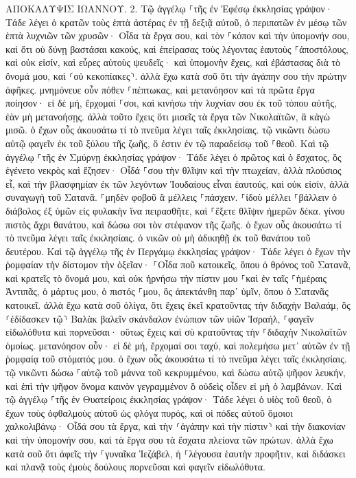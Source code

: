 \documentclass[twoside, 9pt]{extreport}
\begin{document}
ΑΠΟΚΑΛΥΨΙΣ ΙΩΑΝΝΟΥ.
2.
Τῷ ἀγγέλῳ ⸀τῆς ἐν Ἐφέσῳ ἐκκλησίας γράψον· Τάδε λέγει ὁ κρατῶν τοὺς ἑπτὰ ἀστέρας ἐν τῇ δεξιᾷ αὐτοῦ, ὁ περιπατῶν ἐν μέσῳ τῶν ἑπτὰ λυχνιῶν τῶν χρυσῶν· 
Οἶδα τὰ ἔργα σου, καὶ τὸν ⸀κόπον καὶ τὴν ὑπομονήν σου, καὶ ὅτι οὐ δύνῃ βαστάσαι κακούς, καὶ ἐπείρασας τοὺς λέγοντας ἑαυτοὺς ⸀ἀποστόλους, καὶ οὐκ εἰσίν, καὶ εὗρες αὐτοὺς ψευδεῖς· 
καὶ ὑπομονὴν ἔχεις, καὶ ἐβάστασας διὰ τὸ ὄνομά μου, καὶ ⸂οὐ κεκοπίακες⸃. 
ἀλλὰ ἔχω κατὰ σοῦ ὅτι τὴν ἀγάπην σου τὴν πρώτην ἀφῆκες. 
μνημόνευε οὖν πόθεν ⸀πέπτωκας, καὶ μετανόησον καὶ τὰ πρῶτα ἔργα ποίησον· εἰ δὲ μή, ἔρχομαί ⸀σοι, καὶ κινήσω τὴν λυχνίαν σου ἐκ τοῦ τόπου αὐτῆς, ἐὰν μὴ μετανοήσῃς. 
ἀλλὰ τοῦτο ἔχεις ὅτι μισεῖς τὰ ἔργα τῶν Νικολαϊτῶν, ἃ κἀγὼ μισῶ. 
ὁ ἔχων οὖς ἀκουσάτω τί τὸ πνεῦμα λέγει ταῖς ἐκκλησίαις. τῷ νικῶντι δώσω αὐτῷ φαγεῖν ἐκ τοῦ ξύλου τῆς ζωῆς, ὅ ἐστιν ἐν τῷ παραδείσῳ τοῦ ⸀θεοῦ. 
Καὶ τῷ ἀγγέλῳ ⸀τῆς ἐν Σμύρνῃ ἐκκλησίας γράψον· Τάδε λέγει ὁ πρῶτος καὶ ὁ ἔσχατος, ὃς ἐγένετο νεκρὸς καὶ ἔζησεν· 
Οἶδά ⸀σου τὴν θλῖψιν καὶ τὴν πτωχείαν, ἀλλὰ πλούσιος εἶ, καὶ τὴν βλασφημίαν ἐκ τῶν λεγόντων Ἰουδαίους εἶναι ἑαυτούς, καὶ οὐκ εἰσίν, ἀλλὰ συναγωγὴ τοῦ Σατανᾶ. 
⸀μηδὲν φοβοῦ ἃ μέλλεις ⸀πάσχειν. ⸀ἰδοὺ μέλλει ⸀βάλλειν ὁ διάβολος ἐξ ὑμῶν εἰς φυλακὴν ἵνα πειρασθῆτε, καὶ ⸀ἕξετε θλῖψιν ἡμερῶν δέκα. γίνου πιστὸς ἄχρι θανάτου, καὶ δώσω σοι τὸν στέφανον τῆς ζωῆς. 
ὁ ἔχων οὖς ἀκουσάτω τί τὸ πνεῦμα λέγει ταῖς ἐκκλησίαις. ὁ νικῶν οὐ μὴ ἀδικηθῇ ἐκ τοῦ θανάτου τοῦ δευτέρου. 
Καὶ τῷ ἀγγέλῳ τῆς ἐν Περγάμῳ ἐκκλησίας γράψον· Τάδε λέγει ὁ ἔχων τὴν ῥομφαίαν τὴν δίστομον τὴν ὀξεῖαν· 
⸀Οἶδα ποῦ κατοικεῖς, ὅπου ὁ θρόνος τοῦ Σατανᾶ, καὶ κρατεῖς τὸ ὄνομά μου, καὶ οὐκ ἠρνήσω τὴν πίστιν μου ⸀καὶ ἐν ταῖς ⸀ἡμέραις Ἀντιπᾶς, ὁ μάρτυς μου, ὁ πιστός ⸀μου, ὃς ἀπεκτάνθη παρ᾽ ὑμῖν, ὅπου ὁ Σατανᾶς κατοικεῖ. 
ἀλλὰ ἔχω κατὰ σοῦ ὀλίγα, ὅτι ἔχεις ἐκεῖ κρατοῦντας τὴν διδαχὴν Βαλαάμ, ὃς ⸂ἐδίδασκεν τῷ⸃ Βαλὰκ βαλεῖν σκάνδαλον ἐνώπιον τῶν υἱῶν Ἰσραήλ, ⸀φαγεῖν εἰδωλόθυτα καὶ πορνεῦσαι· 
οὕτως ἔχεις καὶ σὺ κρατοῦντας τὴν ⸀διδαχὴν Νικολαϊτῶν ὁμοίως. 
μετανόησον οὖν· εἰ δὲ μή, ἔρχομαί σοι ταχύ, καὶ πολεμήσω μετ᾽ αὐτῶν ἐν τῇ ῥομφαίᾳ τοῦ στόματός μου. 
ὁ ἔχων οὖς ἀκουσάτω τί τὸ πνεῦμα λέγει ταῖς ἐκκλησίαις. τῷ νικῶντι δώσω ⸀αὐτῷ τοῦ μάννα τοῦ κεκρυμμένου, καὶ δώσω αὐτῷ ψῆφον λευκήν, καὶ ἐπὶ τὴν ψῆφον ὄνομα καινὸν γεγραμμένον ὃ οὐδεὶς οἶδεν εἰ μὴ ὁ λαμβάνων. 
Καὶ τῷ ἀγγέλῳ ⸀τῆς ἐν Θυατείροις ἐκκλησίας γράψον· Τάδε λέγει ὁ υἱὸς τοῦ θεοῦ, ὁ ἔχων τοὺς ὀφθαλμοὺς αὐτοῦ ὡς φλόγα πυρός, καὶ οἱ πόδες αὐτοῦ ὅμοιοι χαλκολιβάνῳ· 
Οἶδά σου τὰ ἔργα, καὶ τὴν ⸂ἀγάπην καὶ τὴν πίστιν⸃ καὶ τὴν διακονίαν καὶ τὴν ὑπομονήν σου, καὶ τὰ ἔργα σου τὰ ἔσχατα πλείονα τῶν πρώτων. 
ἀλλὰ ἔχω κατὰ σοῦ ὅτι ἀφεῖς τὴν ⸀γυναῖκα Ἰεζάβελ, ἡ ⸀λέγουσα ἑαυτὴν προφῆτιν, καὶ διδάσκει καὶ πλανᾷ τοὺς ἐμοὺς δούλους πορνεῦσαι καὶ φαγεῖν εἰδωλόθυτα. 
\end{document}
